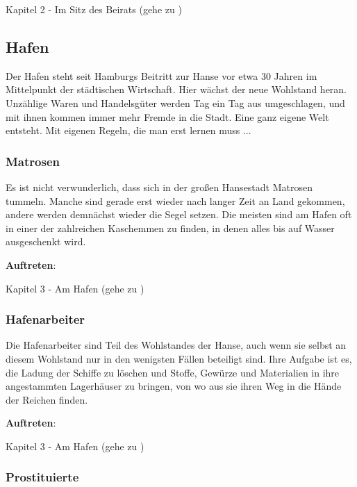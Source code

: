 Kapitel 2 - Im Sitz des Beirats (gehe zu \blue{\ref{kind}})


\subsection{Hafen}

Der Hafen steht seit Hamburgs Beitritt zur Hanse vor etwa 30 Jahren im Mittelpunkt der städtischen Wirtschaft. Hier wächst der neue Wohlstand heran. Unzählige Waren und Handelsgüter werden Tag ein Tag aus umgeschlagen, und mit ihnen kommen immer mehr Fremde in die Stadt. Eine ganz eigene Welt entsteht. Mit eigenen Regeln, die man erst lernen muss ...

\subsubsection*{Matrosen}
\label{Matrosen}

Es ist nicht verwunderlich, dass sich in der großen Hansestadt Matrosen tummeln. Manche sind gerade erst wieder nach langer Zeit an Land gekommen, andere werden demnächst wieder die Segel setzen. Die meisten sind am Hafen oft in einer der zahlreichen Kaschemmen zu finden, in denen alles bis auf Wasser ausgeschenkt wird.

\textbf{Auftreten}:

Kapitel 3 - Am Hafen (gehe zu \blue{\ref{Hafen}})

\subsubsection*{Hafenarbeiter}
\label{Hafenarbeiter}

Die Hafenarbeiter sind Teil des Wohlstandes der Hanse, auch wenn sie selbst an diesem Wohlstand nur in den wenigsten Fällen beteiligt sind. Ihre Aufgabe ist es, die Ladung der Schiffe zu löschen und Stoffe, Gewürze und Materialien in ihre angestammten Lagerhäuser zu bringen, von wo aus sie ihren Weg in die Hände der Reichen finden.


\textbf{Auftreten}:

Kapitel 3 - Am Hafen (gehe zu \blue{\ref{Hafen}})

\subsubsection*{Prostituierte}
\label{Prostituierte}

